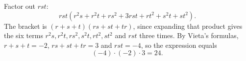 Factor out $rst$:
\[rst\left(r^2s+r^2t+rs^2+3rst+rt^2+s^2t+st^2\right).\]
The bracket is $(r+s+t)(rs+st+tr)$, since expanding that product gives the six terms $r^2s,r^2t,rs^2,s^2t,rt^2,st^2$ and $rst$ three times. By Vieta's formulas, $r+s+t=-2$, $rs+st+tr=3$ and $rst=-4$, so the expression equals
\[(-4)\cdot(-2)\cdot3=\boxed{24}.\]
